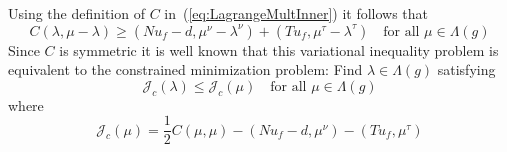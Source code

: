 \documentclass[12pt,a4paper]{article}
\numberwithin{equation}{section}
\numberwithin{table}{section}
\numberwithin{figure}{section}
\newcommand{\J}{\ensuremath{\mathcal{J}}}
\newcommand{\half}{\ensuremath{\frac{1}{2}}}
\newcommand{\qforall}{\quad\text{for all }}
\begin{document}
Using the definition of $C$ in~(\ref{eq:LagrangeMultInner}) it follows that
\begin{equation}
  \label{eq:48}
    C(\lambda, \mu-\lambda) \ge (N u_f-d, \mu^\nu-\lambda^\nu)
    + (T u_f, \mu^\tau-\lambda^\tau)
  \qforall \mu \in \Lambda(g)
\end{equation}
Since $C$ is symmetric it is well known that this variational inequality problem is
equivalent to the constrained minimization problem: Find $\lambda\in\Lambda(g)$ satisfying
\begin{equation}
  \label{eq:49}
  \J_c (\lambda) \le \J_c(\mu)\qforall \mu\in\Lambda(g)
\end{equation}
where
\begin{equation}
  \label{eq:50}
  \J_c(\mu) = \half C(\mu,\mu) - (N u_f-d, \mu^\nu) - (T u_f, \mu^\tau)
\end{equation}
\end{document}
